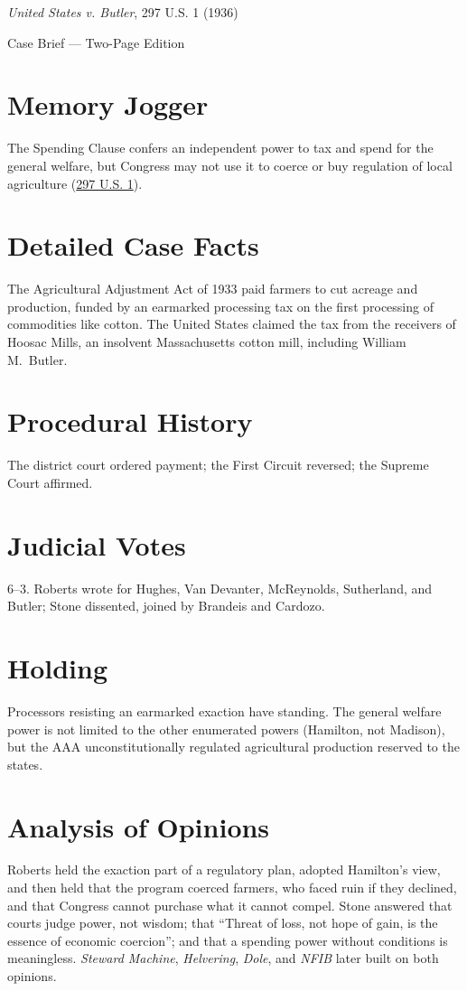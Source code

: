 \documentclass[12pt]{article}
\begin{document}
\begin{center}
{\LARGE \textit{United States v. Butler}, 297 U.S. 1 (1936)\par}
\vspace{0.5em}
{\large Case Brief --- Two-Page Edition\par}
\end{center}

\section{Memory Jogger}
The Spending Clause confers an independent power to tax and spend for the general welfare, but Congress may not use it to coerce or buy regulation of local agriculture (\href{https://supreme.justia.com/cases/federal/us/297/1/}{297 U.S. 1}).

\section{Detailed Case Facts}
The Agricultural Adjustment Act of 1933 paid farmers to cut acreage and production, funded by an earmarked processing tax on the first processing of commodities like cotton. The United States claimed the tax from the receivers of Hoosac Mills, an insolvent Massachusetts cotton mill, including William M.\ Butler.

\section{Procedural History}
The district court ordered payment; the First Circuit reversed; the Supreme Court affirmed.

\section{Judicial Votes}
6--3. Roberts wrote for Hughes, Van Devanter, McReynolds, Sutherland, and Butler; Stone dissented, joined by Brandeis and Cardozo.

\section{Holding}
Processors resisting an earmarked exaction have standing. The general welfare power is not limited to the other enumerated powers (Hamilton, not Madison), but the AAA unconstitutionally regulated agricultural production reserved to the states.

\section{Analysis of Opinions}
Roberts held the exaction part of a regulatory plan, adopted Hamilton's view, and then held that the program coerced farmers, who faced ruin if they declined, and that Congress cannot purchase what it cannot compel. Stone answered that courts judge power, not wisdom; that ``Threat of loss, not hope of gain, is the essence of economic coercion''; and that a spending power without conditions is meaningless. \textit{Steward Machine}, \textit{Helvering}, \textit{Dole}, and \textit{NFIB} later built on both opinions.
\end{document}

